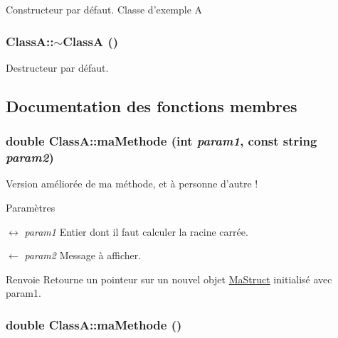 Constructeur par défaut. Classe d'exemple A \hypertarget{class_class_a_a6ead4513f775571caf3c0387d535783f}{
\subsubsection[{$\sim$ClassA}]{\setlength{\rightskip}{0pt plus 5cm}ClassA::$\sim$ClassA ()}}
\label{class_class_a_a6ead4513f775571caf3c0387d535783f}


Destructeur par défaut. 

\subsection{Documentation des fonctions membres}
\hypertarget{class_class_a_a30a91a34f55c7cafb8922c55c0e99d50}{
\subsubsection[{maMethode}]{\setlength{\rightskip}{0pt plus 5cm}double ClassA::maMethode (int {\em param1}, \/  const string {\em param2})}}
\label{class_class_a_a30a91a34f55c7cafb8922c55c0e99d50}


Version améliorée de ma méthode, et à personne d'autre ! 
\begin{DoxyParams}{Paramètres}
\item[\mbox{$\leftrightarrow$} {\em param1}]Entier dont il faut calculer la racine carrée. \item[\mbox{$\leftarrow$} {\em param2}]Message à afficher. \end{DoxyParams}
\begin{DoxyReturn}{Renvoie}
Retourne un pointeur sur un nouvel objet \hyperlink{struct_class_a_1_1_ma_struct}{MaStruct} initialisé avec param1. 
\end{DoxyReturn}
\hypertarget{class_class_a_aa95d318339e8bdb65954c7942f1e1f78}{
\subsubsection[{maMethode}]{\setlength{\rightskip}{0pt plus 5cm}double ClassA::maMethode ()}}
\label{class_class_a_aa95d318339e8bdb65954c7942f1e1f78}


